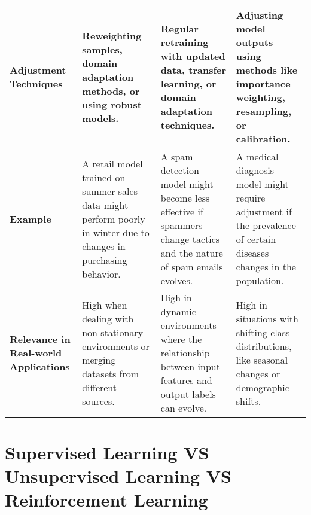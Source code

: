 \begin{longtable}{|m{2cm}|m{4.5cm}|m{4.5cm}|m{4.5cm}|}
    \textbf{Adjustment Techniques} & Reweighting samples, domain adaptation methods, or using robust models. & Regular retraining with updated data, transfer learning, or domain adaptation techniques. & Adjusting model outputs using methods like importance weighting, resampling, or calibration. \\ \hline

    \textbf{Example} & A retail model trained on summer sales data might perform poorly in winter due to changes in purchasing behavior. & A spam detection model might become less effective if spammers change tactics and the nature of spam emails evolves. & A medical diagnosis model might require adjustment if the prevalence of certain diseases changes in the population. \\ \hline

    \textbf{Relevance in Real-world Applications} & High when dealing with non-stationary environments or merging datasets from different sources. & High in dynamic environments where the relationship between input features and output labels can evolve. & High in situations with shifting class distributions, like seasonal changes or demographic shifts. \\ \hline

\end{longtable}


\section{Supervised Learning VS Unsupervised Learning VS Reinforcement Learning \cite{chatgpt,medium-numsmt2-rl-ch1-part-1}}\label{Supervised Learning VS Unsupervised Learning VS Reinforcement Learning}

